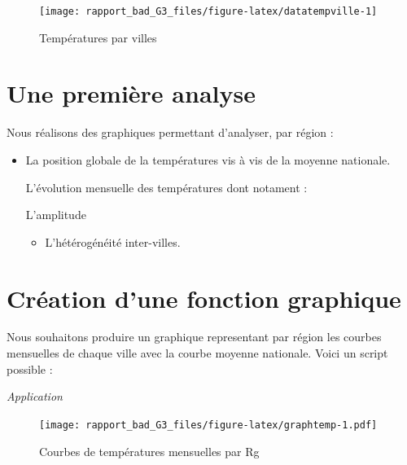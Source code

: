 \documentclass[
]{article}
\providecommand{\tightlist}{%
  \setlength{\itemsep}{0pt}\setlength{\parskip}{0pt}}
\begin{document}
\begin{figure}[h]

{\centering \texttt{[image: rapport\_bad\_G3\_files/figure-latex/datatempville-1]} 

}

\caption{Températures par villes\label{fig:tempvilles}}\label{fig:datatempville}
\end{figure}

\hypertarget{une-premiuxe8re-analyse}{%
\section{\texorpdfstring{\textbf{Une première analyse
}}{Une première analyse }}\label{une-premiuxe8re-analyse}}

Nous réalisons des graphiques permettant d'analyser, par région :

\begin{itemize}
\item
  La position globale de la températures vis à vis de la moyenne
  nationale.

  L'évolution mensuelle des températures dont notament :

  L'amplitude

  \begin{itemize}
  \tightlist
  \item
    L'hétérogénéité inter-villes.
  \end{itemize}
\end{itemize}

\hypertarget{cruxe9ation-dune-fonction-graphique}{%
\section{\texorpdfstring{\textbf{Création d'une fonction
graphique}}{Création d'une fonction graphique}}\label{cruxe9ation-dune-fonction-graphique}}

Nous souhaitons produire un graphique representant par région les
courbes mensuelles de chaque ville avec la courbe moyenne nationale.
Voici un script possible :

\emph{Application}

\begin{figure}
\centering
\texttt{[image: rapport\_bad\_G3\_files/figure-latex/graphtemp-1.pdf]}
\caption{Courbes de températures mensuelles par Rg}
\end{figure}
\end{document}

